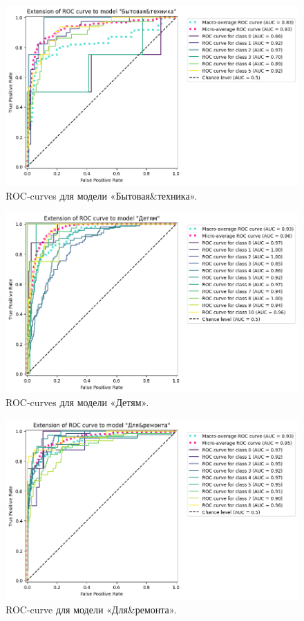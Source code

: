 \documentclass[a4paper,12pt]{extarticle}
\begin{document}
\begin{figure}[hbtp]
	\centering
	\includegraphics[scale=0.7]{roc_curves/roccurve_Бытовая&техника.png}
	\caption{ROC-curves для модели «Бытовая\&техника».}
	\label{fig:roccurve_Бытовая&техника}
\end{figure}

\begin{figure}[hbtp]
	\centering
	\includegraphics[scale=0.7]{roc_curves/roccurve_Детям.png}
	\caption{ROC-curves для модели «Детям».}
	\label{fig:roccurve_Детям}
\end{figure}

\begin{figure}[hbtp]
	\centering
	\includegraphics[scale=0.7]{roc_curves/roccurve_Для&ремонта.png}
	\caption{ROC-curve для модели «Для\&ремонта».}
	\label{fig:roccurve_Для&ремонта}
\end{figure}
\end{document}
